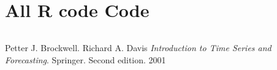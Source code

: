\documentclass[11pt, oneside]{article}   	%
\begin{document}
% 
% 
% 





\section{All R code Code}

\begin{lstlisting}
\end{lstlisting}



\begin{thebibliography}{9}
Petter J. Brockwell. Richard A. Davis
\textit{Introduction to Time Series and Forecasting}. 
Springer. Second edition. 2001
 
\end{thebibliography}
\end{document}
